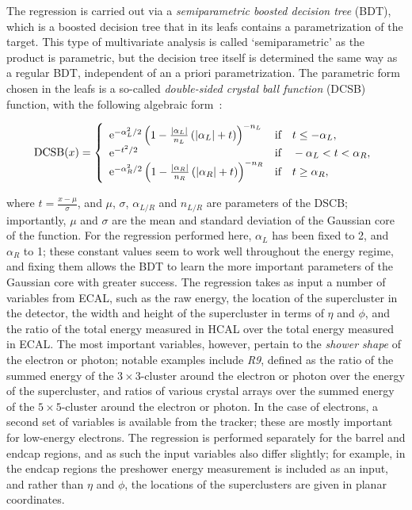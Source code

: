 The regression is carried out via a \textit{semiparametric boosted decision tree} (BDT), which is a boosted decision tree that in its leafs contains a parametrization of the target.
% 
This type of multivariate analysis is called `semiparametric' as the product is parametric, but the decision tree itself is determined the same way as a regular BDT, independent of an a priori parametrization.
% 
The parametric form chosen in the leafs is a so-called \textit{double-sided crystal ball function} (DCSB) function, with the following algebraic form~\cite{Aad:2015oqa}:
% 
\begin{linenomath*}
\begin{equation}
\label{eq:dscb}
\text{DCSB}(x) = \left\{
    \begin{array}{ll}
    \mathrm{e}^{-\alpha_L^2/2}
        \left( 1-\frac{\left| \alpha_L \right |}{n_L} \left(\left| \alpha_L \right |+t\right) \right)^{-n_L}
        & \text{if} \quad t \leq -\alpha_L, \\
    \mathrm{e}^{-t^2/2} & \text{if} \quad -\alpha_L < t < \alpha_R, \\
    \mathrm{e}^{-\alpha_R^2/2}
        \left( 1-\frac{\left| \alpha_R \right |}{n_R} \left(\left| \alpha_R \right |+t\right) \right)^{-n_R}
        & \text{if} \quad t \geq \alpha_R, \\
    \end{array}
    \right.
\end{equation}
\end{linenomath*}
% 
where $t = \frac{x-\mu}{\sigma}$, and $\mu$, $\sigma$, $\alpha_{L/R}$ and $n_{L/R}$ are parameters of the DSCB; importantly, $\mu$ and $\sigma$ are the mean and standard deviation of the Gaussian core of the function.
% 
For the regression performed here, $\alpha_L$ has been fixed to 2, and $\alpha_R$ to 1; these constant values seem to work well throughout the energy regime, and fixing them allows the BDT to learn the more important parameters of the Gaussian core with greater success.
% 
The regression takes as input a number of variables from ECAL, such as the raw energy, the location of the supercluster in the detector, the width and height of the supercluster in terms of $\eta$ and $\phi$, and the ratio of the total energy measured in HCAL over the total energy measured in ECAL.
% 
The most important variables, however, pertain to the \textit{shower shape} of the electron or photon; notable examples include \textit{R9}, defined as the ratio of the summed energy of the $3\times3$-cluster around the electron or photon over the energy of the supercluster, and ratios of various crystal arrays over the summed energy of the $5\times5$-cluster around the electron or photon.
% 
In the case of electrons, a second set of variables is available from the tracker; these are mostly important for low-energy electrons.
% 
The regression is performed separately for the barrel and endcap regions, and as such the input variables also differ slightly; for example, in the endcap regions the preshower energy measurement is included as an input, and rather than $\eta$ and $\phi$, the locations of the superclusters are given in planar coordinates.


